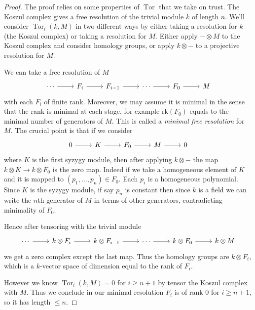 \documentclass[a4paper]{article}
\DeclareMathOperator{\Tor}{Tor}
\begin{document}
\begin{proof}
  The proof relies on some properties of \(\Tor\) that we take on trust. The Koszul complex gives a free resolution of the trivial module \(k\) of length \(n\). We'll consider \(\Tor_i(k, M)\) in two different ways by either taking a resolution for \(k\) (the Koszul complex) or taking a resolution for \(M\). Either apply \(- \otimes M\) to the Koszul complex and consider homology groups, or apply \(k \otimes -\) to a projective resolution for \(M\).

  We can take a free resolution of \(M\)
  \[
    \begin{tikzcd}
      \cdots \ar[r] & F_i \ar[r] & F_{i - 1} \ar[r] & \cdots \ar[r] & F_0 \ar[r] & M
    \end{tikzcd}
  \]
  with each \(F_i\) of finite rank. Moreover, we may assume it is minimal in the sense that the rank is minimal at each stage, for example \(\mathrm{rk}(F_0)\) equals to the minimal number of generators of \(M\). This is called a \emph{minimal free resolution} for \(M\). The crucial point is that if we consider
  \[
    \begin{tikzcd}
      0 \ar[r] & K \ar[r] & F_0 \ar[r] & M \ar[r] & 0
    \end{tikzcd}
  \]
  where \(K\) is the first syzygy module, then after applying \(k \otimes -\) the map \(k \otimes K \to k \otimes F_0\) is the zero map. Indeed if we take a homogeneous element of \(K\) and it is mapped to \((p_1, \dots, p_n) \in F_0\). Each \(p_i\) is a homogeneous polynomial. Since \(K\) is the syzygy module, if say \(p_n\) is constant then since \(k\) is a field we can write the \(n\)th generator of \(M\) in terms of other generators, contradicting minimality of \(F_0\).
  
  Hence after tensoring with the trivial module
  \[
    \begin{tikzcd}
      \cdots \ar[r] & k \otimes F_i \ar[r] & k \otimes F_{i - 1} \ar[r] & \cdots \ar[r] & k \otimes F_0 \ar[r] & k \otimes M
    \end{tikzcd}
  \]
  we get a zero complex except the last map. Thus the homology groups are \(k \otimes F_i\), which is a \(k\)-vector space of dimension equal to the rank of \(F_i\).

  However we know \(\Tor_i(k, M) = 0\) for \(i \geq n + 1\) by tensor the Koszul complex with \(M\). Thus we conclude in our minimal resolution \(F_i\) is of rank \(0\) for \(i \geq n + 1\), so it has length \(\leq n\).
\end{proof}
\end{document}
